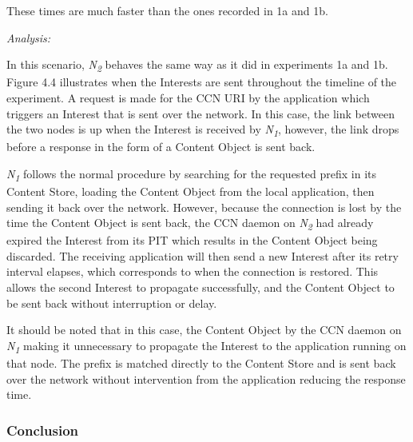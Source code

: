 \documentclass[a4paper,12pt]{report}      %
\begin{document}
These times are much faster than the ones recorded in 1a and 1b.

\vspace*{1\baselineskip}\noindent\emph{Analysis:}

In this scenario, \emph{N\textsubscript{2}} behaves the same way as it did in experiments 1a and 1b. Figure 4.4 illustrates when the Interests
are sent throughout the timeline of the experiment. A request is made for the CCN URI by the application which triggers an Interest that is sent over the network. In this case, the link between the two nodes is up when the Interest is received by \emph{N\textsubscript{1}}, 
however, the link drops before a response in the form of a Content Object is sent back.

\emph{N\textsubscript{1}} follows the normal procedure by searching for the requested prefix in its Content
Store, loading the Content Object from the local application, then sending it back over the network.
However, because the connection is lost by the time the Content Object is sent back, the CCN
daemon on \emph{N\textsubscript{2}} had already expired the Interest from its PIT which results in the Content
Object being discarded. The receiving application will then send a new Interest after its retry
interval elapses, which corresponds to when the connection is restored. This allows the second Interest
to propagate successfully, and the Content Object to be sent back without interruption or delay.

It should be noted that in this case, the Content Object by the CCN daemon on \emph{N\textsubscript{1}}  making
it unnecessary to propagate the Interest to the application running on that node. The prefix is matched
directly to the Content Store and is sent back over the network without intervention from the
application reducing the response time.


\subsubsection{Conclusion}
\end{document}
